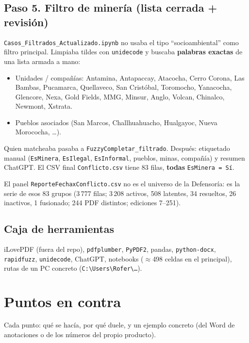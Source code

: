 \documentclass[11pt,a4paper]{article}
\begin{document}
\subsection{Paso 5. Filtro de minería (lista cerrada + revisión)}

\texttt{Casos\_Filtrados\_Actualizado.ipynb} no usaba el tipo ``socioambiental'' como filtro principal. Limpiaba tildes con \texttt{unidecode} y buscaba \textbf{palabras exactas} de una lista armada a mano:

\begin{itemize}
  \item Unidades / compañías: Antamina, Antapaccay, Atacocha, Cerro Corona, Las Bambas, Pucamarca, Quellaveco, San Cristóbal, Toromocho, Yanacocha, Glencore, Nexa, Gold Fields, MMG, Minsur, Anglo, Volcan, Chinalco, Newmont, Xstrata.
  \item Pueblos asociados (San Marcos, Challhuahuacho, Hualgayoc, Nueva Morococha, \ldots).
\end{itemize}

Quien matcheaba pasaba a \texttt{FuzzyCompletar\_filtrado}. Después: etiquetado manual (\texttt{EsMinera}, \texttt{EsIlegal}, \texttt{EsInformal}, pueblos, minas, compañía) y resumen ChatGPT. El CSV final \texttt{Conflicto.csv} tiene 83 filas, \textbf{todas} \texttt{EsMinera = Sí}.

El panel \texttt{ReporteFechaxConflicto.csv} no es el universo de la Defensoría: es la serie de esos 83 grupos (3\,777 filas; 3\,208 activos, 508 latentes, 34 resueltos, 26 inactivos, 1 fusionado; 244 PDF distintos; ediciones 7--251).

\subsection{Caja de herramientas}

iLovePDF (fuera del repo), \texttt{pdfplumber}, \texttt{PyPDF2}, pandas, \texttt{python-docx}, \texttt{rapidfuzz}, \texttt{unidecode}, ChatGPT, notebooks ($\approx$498 celdas en el principal), rutas de un PC concreto (\texttt{C:\textbackslash Users\textbackslash Rofer\textbackslash \ldots}).

\section{Puntos en contra}

Cada punto: qué se hacía, por qué duele, y un ejemplo concreto (del Word de anotaciones o de los números del propio producto).
\end{document}
